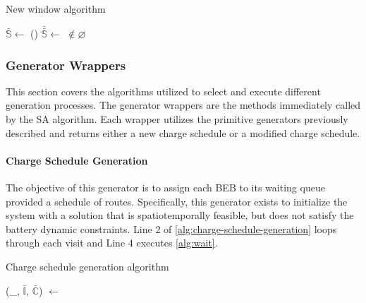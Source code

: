 \documentclass[11pt,a4paper,final]{article}
\newcommand{\I}{\mathbb{I}}                 %
\newcommand{\C}{\mathbb{C}}                 %
\newcommand{\Sol}{\mathbb{S}}               %
\begin{document}
\begin{algorithm}[H]
  \caption{New window algorithm} \label{alg:new-window}
  \LinesNumbered
  \KwIn{$\Sol$}
  \KwOut{$\bar{\Sol}$}


  \Begin
  {
    $\bar{\Sol} \leftarrow$\Purge{$\Sol$}
    \If()
       {
         $\bar{\bar{\Sol}} \leftarrow$ \NewVisit{$\bar{\Sol}$} $\not\in \varnothing$
       }
       {
         \Return{$\bar{\bar{\Sol}}$} 
       }

       \Return{($\varnothing$)}
  }
\end{algorithm}

\subsubsection{Generator Wrappers}
\label{sec:generator-wrappers}
This section covers the algorithms utilized to select and execute different generation processes. The generator wrappers
are the methods immediately called by the SA algorithm. Each wrapper utilizes the primitive generators previously
described and returns either a new charge schedule or a modified charge schedule.

\paragraph{Charge Schedule Generation}
\label{sec:charge-schedule-generation}
The objective of this generator is to assign each BEB to its waiting queue provided a schedule of routes. Specifically,
this generator exists to initialize the system with a solution that is spatiotemporally feasible, but does not satisfy
the battery dynamic constraints. Line 2 of \ref{alg:charge-schedule-generation} loops through each visit and Line 4
executes \ref{alg:wait}.

\begin{algorithm}[H]
\caption{Charge schedule generation algorithm} \label{alg:charge-schedule-generation}
    \LinesNumbered
    \KwIn{$\I$, $\C$}
    \KwOut{$\bar{\I}$, $\bar{\C}$}


    \Begin
    {
        \ForEach {$\I_i \in \I$}
        {
            (\_, $\bar{\I}$, $\bar{\C}$) $\leftarrow$ \Wait{($\I_i$, $\I$, $\C$)}
        }
            \Return{($\bar{\I}$, $\bar{\C}$)}
    }
  \end{algorithm}
\end{document}
